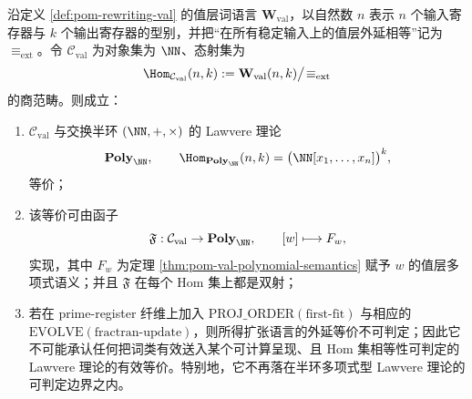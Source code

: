 \begin{theorem}\label{thm:conclusion-val-lawvere-equivalence-firstfit-collapse}
沿定义 \ref{def:pom-rewriting-val} 的值层词语言 \(\mathbf{W}_{\mathrm{val}}\)，以自然数 \(n\) 表示 \(n\) 个输入寄存器与 \(k\) 个输出寄存器的型别，并把“在所有稳定输入上的值层外延相等”记为 \(\equiv_{\mathrm{ext}}\)。令 \(\mathcal C_{\mathrm{val}}\) 为对象集为 \(\NN\)、态射集为
\[
\Hom_{\mathcal C_{\mathrm{val}}}(n,k)
:=
\mathbf{W}_{\mathrm{val}}(n,k)\big/\!\equiv_{\mathrm{ext}}
\]
的商范畴。则成立：
\begin{enumerate}
\normalfont
  \item \(\mathcal C_{\mathrm{val}}\) 与交换半环 \((\NN,+,\times)\) 的 Lawvere 理论
  \[
  \mathbf{Poly}_{\NN},
  \qquad
  \Hom_{\mathbf{Poly}_{\NN}}(n,k)=\bigl(\NN[x_1,\dots,x_n]\bigr)^k,
  \]
  等价；
  \item 该等价可由函子
  \[
  \mathfrak F:\mathcal C_{\mathrm{val}}\to \mathbf{Poly}_{\NN},
  \qquad
  [w]\longmapsto F_w,
  \]
  实现，其中 \(F_w\) 为定理 \ref{thm:pom-val-polynomial-semantics} 赋予 \(w\) 的值层多项式语义；并且 \(\mathfrak F\) 在每个 Hom 集上都是双射；
  \item 若在 prime-register 纤维上加入 \(\mathrm{PROJ\_ORDER}(\text{first-fit})\) 与相应的 \(\mathrm{EVOLVE}(\text{fractran-update})\)，则所得扩张语言的外延等价不可判定；因此它不可能承认任何把词类有效送入某个可计算呈现、且 Hom 集相等性可判定的 Lawvere 理论的有效等价。特别地，它不再落在半环多项式型 Lawvere 理论的可判定边界之内。
\end{enumerate}
\end{theorem}
